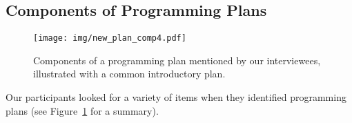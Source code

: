 


\subsection{Components of Programming Plans} 
\label{sec:components}

\begin{figure}
\centering
\texttt{[image: img/new\_plan\_comp4.pdf]}
 \caption{Components of a programming plan mentioned by our interviewees, illustrated with a common introductory plan.}
\label{fig:plan-components}
\end{figure}

Our participants looked for a variety of items when they identified programming plans
(see Figure~\ref{fig:plan-components} for a summary). %

